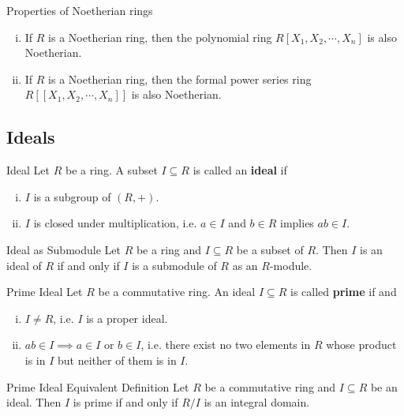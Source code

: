 \begin{proposition}{Properties of Noetherian rings}{}
    \begin{enumerate}[(i)]
        \item If $R$ is a Noetherian ring, then the polynomial ring $R[X_1,X_2,\cdots,X_n]$ is also Noetherian.
        \item If $R$ is a Noetherian ring, then the  formal power series ring $R[[X_1,X_2,\cdots,X_n]]$ is also Noetherian.
    \end{enumerate}
\end{proposition}


\subsection{Ideals}
\begin{definition}{Ideal}{}
    Let $R$ be a ring. A subset $I\subseteq R$ is called an \textbf{ideal} if
    \begin{enumerate}[(i)]
        \item $I$ is a subgroup of $(R,+)$.
        \item $I$ is closed under multiplication, i.e. $a\in I$ and $b\in R$ implies $ab\in I$.
    \end{enumerate}
\end{definition}


\begin{proposition}{Ideal as Submodule}{}
    Let $R$ be a ring and $I\subseteq R$ be a subset of $R$. Then $I$ is an ideal of $R$ if and only if $I$ is a submodule of $R$ as an $R$-module.
\end{proposition}


\begin{definition}{Prime Ideal}{}
    Let $R$ be a commutative ring. An ideal $I\subseteq R$ is called \textbf{prime} if  and 
    \begin{enumerate}[(i)]
        \item $I\neq R$, i.e. $I$ is a proper ideal.
        \item $ab\in I\implies a\in I\text{ or }b\in I$, i.e. there exist no two elements in $R$ whose product is in $I$ but neither of them is in $I$.
    \end{enumerate}    
\end{definition}

\begin{proposition}{Prime Ideal Equivalent Definition}{}
    Let $R$ be a commutative ring and $I\subseteq R$ be an ideal. Then $I$ is prime if and only if $R/I$ is an integral domain.
\end{proposition}

